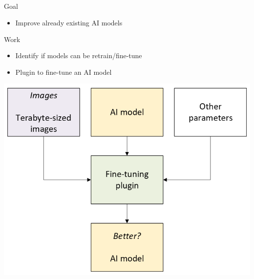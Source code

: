 \subsection{\slidetitle}
\begin{frame}
  \frametitle{\sectiontitle}
  \framesubtitle{\slidetitle}

  \begin{minipage}[h!]{0.53\textwidth}
    Goal
    \begin{itemize}
      \item Improve already existing AI models
    \end{itemize}

    \bigskip

    Work
    \begin{itemize}
      \item Identify if models can be retrain/fine-tune
      \item Plugin to fine-tune an AI model
    \end{itemize}

  \end{minipage}\hfill
  \begin{minipage}[h!]{0.46\textwidth}
    \includegraphics[scale=0.55]{./img/5_conclusion.png}
  \end{minipage}
\end{frame}